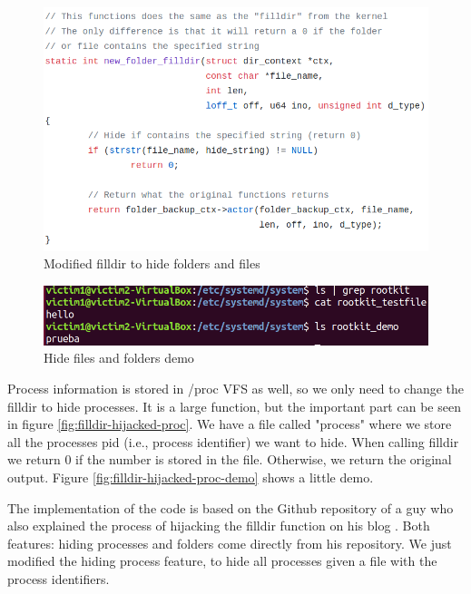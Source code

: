 \documentclass[11pt, a4paper,twoside]{tesi_upf}
\begin{document}
\begin{figure}
    \centering
    \includegraphics[width=\linewidth]{images/hide-folder-code.png}
    \caption{Modified filldir to hide folders and files}
    \label{fig:hide-folders-files}
\end{figure}

\begin{figure}
    \centering
    \includegraphics[width=\linewidth]{images/hide-example.png}
    \caption{Hide files and folders demo}
    \label{fig:filldir-hijacked-demo}
\end{figure}
\newpage
Process information is stored in /proc VFS as well, so we only need to change the filldir to hide processes. It is a large function, but the important part can be seen in figure \ref{fig:filldir-hijacked-proc}. We have a file called "process" where we store all the processes pid (i.e., process identifier) we want to hide. When calling filldir we return 0 if the number is stored in the file. Otherwise, we return the original output. Figure \ref{fig:filldir-hijacked-proc-demo} shows a little demo.

The implementation of the code is based on the Github repository of a guy who also explained the process of hijacking the filldir function on his blog \cite{rootkit-folder}. Both features: hiding processes and folders come directly from his repository. We just modified the hiding process feature, to hide all processes given a file with the process identifiers.
\end{document}
